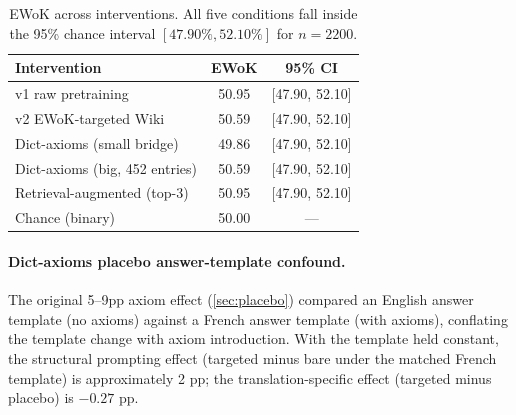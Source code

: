 \documentclass[11pt]{article}
\begin{document}
\begin{table}[h]
\centering
\begin{tabular}{lcc}
\toprule
Intervention & EWoK & 95\% CI \\
\midrule
v1 raw pretraining & 50.95 & [47.90, 52.10] \\
v2 EWoK-targeted Wiki & 50.59 & [47.90, 52.10] \\
Dict-axioms (small bridge) & 49.86 & [47.90, 52.10] \\
Dict-axioms (big, 452 entries) & 50.59 & [47.90, 52.10] \\
Retrieval-augmented (top-3) & 50.95 & [47.90, 52.10] \\
\midrule
Chance (binary) & 50.00 & --- \\
\bottomrule
\end{tabular}
\caption{EWoK across interventions. All five conditions fall inside the 95\% chance interval $[47.90\%, 52.10\%]$ for $n\!=\!2200$.}
\label{tab:ewok-domain}
\end{table}

\paragraph{Dict-axioms placebo answer-template confound.} The original 5--9pp axiom effect (\autoref{sec:placebo}) compared an English answer template (no axioms) against a French answer template (with axioms), conflating the template change with axiom introduction. With the template held constant, the structural prompting effect (targeted minus bare under the matched French template) is approximately 2 pp; the translation-specific effect (targeted minus placebo) is $-0.27$ pp.
\end{document}
